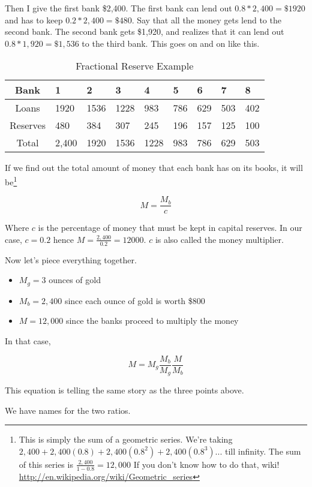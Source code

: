 \documentclass[11pt]{scrartcl}
\begin{document}
Then I give the first bank \$2,400. The first bank can lend out $0.8 * 2,400 = \$1920$ and has to keep $0.2 * 2,400 = \$480$. Say that all the money gets lend to the second bank. The second bank gets \$1,920, and realizes that it can lend out $0.8 * 1,920 = \$1,536$ to the third bank. This goes on and on like this.

\begin{table}[H]
\centering
\begin{tabularx}{\textwidth}{c*{8}{Y}}
\toprule
Bank & 1 & 2 & 3 & 4 & 5 & 6 & 7 & 8 \\
\midrule
Loans & 1920 & 1536 & 1228 & 983 & 786 & 629 & 503 & 402 \\
Reserves & 480 & 384 & 307 & 245 & 196 & 157 & 125 & 100 \\
Total & 2,400 & 1920 & 1536 & 1228 & 983 & 786 & 629 & 503 \\
\bottomrule
\end{tabularx}
\caption{Fractional Reserve Example}
\end{table}

If we find out the total amount of money that each bank has on its books, it will be\footnote{This is simply the sum of a geometric series. We're taking $2,400 + 2,400(0.8) + 2,400(0.8^2) + 2,400(0.8^3) ... $ till infinity. The sum of this series is $\frac{2,400}{1-0.8} = 12,000$ If you don't know how to do that, wiki! \url{http://en.wikipedia.org/wiki/Geometric_series}}

\[ M = \frac{M_b}{c} \]

Where $c$ is the percentage of money that must be kept in capital reserves. In our case, $c = 0.2$ hence $M = \frac{2,400}{0.2} = 12000$. $c$ is also called the money multiplier.

Now let's piece everything together. 

\begin{itemize}
\item $M_g = 3$ ounces of gold
\item $M_b = 2,400$ since each ounce of gold is worth \$800
\item $M = 12,000$ since the banks proceed to multiply the money
\end{itemize}

In that case,

\[ M = M_g \frac{M_b}{M_g} \frac{M}{M_b} \]

This equation is telling the same story as the three points above.

We have names for the two ratios. 
\end{document}
